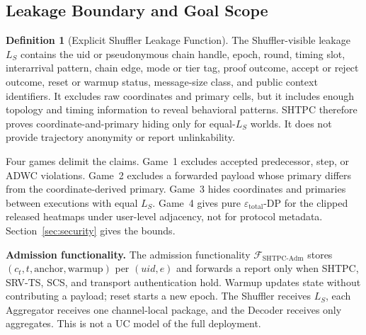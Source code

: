 \documentclass[journal]{IEEEtran}
\theoremstyle{definition}
\newtheorem{definition}{Definition}
\theoremstyle{plain}
\begin{document}
\subsection{Leakage Boundary and Goal Scope}
\label{sec:prelim-dp}

\begin{definition}[Explicit Shuffler Leakage Function]
  \label{def:shuffler-leakage}
  The Shuffler-visible leakage \(L_S\) contains the uid or pseudonymous chain
  handle, epoch, round, timing slot, interarrival pattern, chain edge, mode or
  tier tag, proof outcome, accept or reject outcome, reset or warmup status,
  message-size class, and public context identifiers. It excludes raw
  coordinates and primary cells, but it includes enough topology and timing
  information to reveal behavioral patterns. \textsc{SHTPC} therefore proves
  coordinate-and-primary hiding only for equal-\(L_S\) worlds. It does not
  provide trajectory anonymity or report unlinkability.
\end{definition}

Four games delimit the claims. Game~1 excludes accepted predecessor, step, or
ADWC violations. Game~2 excludes a forwarded payload whose primary differs
from the coordinate-derived primary. Game~3 hides coordinates and primaries
between executions with equal \(L_S\). Game~4 gives pure
\(\varepsilon_{\mathrm{total}}\)-DP for the clipped released heatmaps under
user-level adjacency, not for protocol metadata. Section~\ref{sec:security}
gives the bounds.

\noindent\textbf{Admission functionality.}
\label{sec:formal-model}
The admission functionality \(\mathcal{F}_{\mathrm{SHTPC\text{-}Adm}}\) stores
\((c_t,t,\mathrm{anchor},\mathrm{warmup})\) per \((uid,e)\) and forwards a
report only when SHTPC, SRV-TS, SCS, and transport authentication hold. Warmup
updates state without contributing a payload; reset starts a new epoch. The
Shuffler receives \(L_S\), each Aggregator receives one channel-local package,
and the Decoder receives only aggregates. This is not a UC model of the full
deployment.
\end{document}
